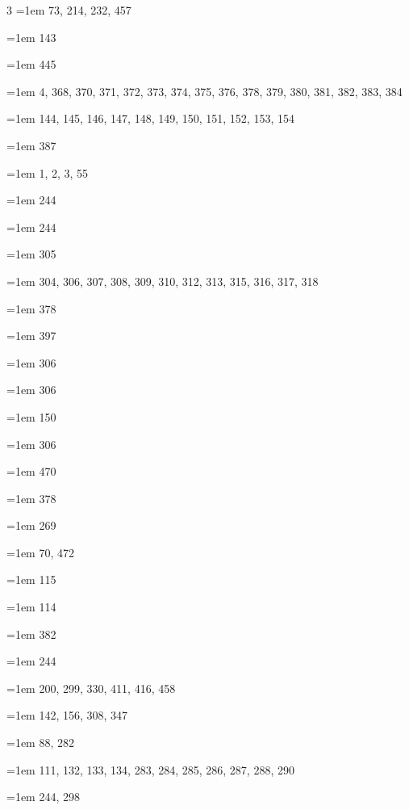 \begin{multicols}{3}
\hangindent=1em  73, 214, 232, 457\par
\hangindent=1em  143\par
\hangindent=1em  445\par
\hangindent=1em  4, 368, 370, 371, 372, 373, 374, 375, 376, 378, 379, 380, 381, 382, 383, 384\par
\hangindent=1em  144, 145, 146, 147, 148, 149, 150, 151, 152, 153, 154\par
\hangindent=1em  387\par
\hangindent=1em  1, 2, 3, 55\par
\hangindent=1em  244\par
\hangindent=1em  244\par
\hangindent=1em  305\par
\hangindent=1em  304, 306, 307, 308, 309, 310, 312, 313, 315, 316, 317, 318\par
\hangindent=1em  378\par
\hangindent=1em  397\par
\hangindent=1em  306\par
\hangindent=1em  306\par
\hangindent=1em  150\par
\hangindent=1em  306\par
\hangindent=1em  470\par
\hangindent=1em  378\par
\hangindent=1em  269\par
\hangindent=1em  70, 472\par
\hangindent=1em  115\par
\hangindent=1em  114\par
\hangindent=1em  382\par
\hangindent=1em  244\par
\hangindent=1em  200, 299, 330, 411, 416, 458\par
\hangindent=1em  142, 156, 308, 347\par
\hangindent=1em  88, 282\par
\hangindent=1em  111, 132, 133, 134, 283, 284, 285, 286, 287, 288, 290\par
\hangindent=1em  244, 298\par

\end{multicols}
